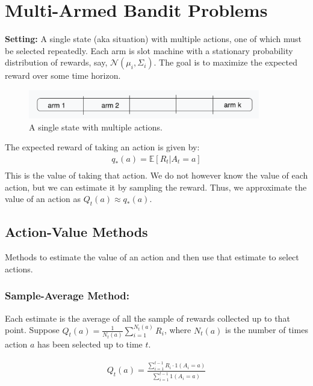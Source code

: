 \section{Multi-Armed Bandit Problems}
\textbf{Setting:} A single state (aka situation) with multiple actions, one of which must be selected repeatedly. Each arm is slot machine with a stationary
probability distribution of rewards, say, $\mathcal{N}(\mu_i, \Sigma_i)$. The goal is to maximize the expected reward over some time horizon.

\begin{figure}[h]
    \centering
    \includegraphics[width=0.9\textwidth]{img/bandit.png}
    \caption{A single state with multiple actions.}
    \label{fig:bandit}
\end{figure}


The expected reward of taking an action is given by:
\begin{equation}
    \begin{split}
        q_*(a) = \mathbb{E}[R_t | A_t = a] \\
        \label{eq:bandit}
    \end{split}
\end{equation}
This is the value of taking that action. We do not however know the value of each action, but we can estimate it by sampling the reward.
Thus, we approximate the value of an action as $Q_t(a) \approx q_*(a)$.

\subsection{Action-Value Methods}
Methods to estimate the value of an action and then use that estimate to select actions.

\subsubsection{Sample-Average Method:}
Each estimate is the average of all the sample of rewards collected up to that point.
\newline
Suppose $Q_t(a) = \frac{1}{N_t(a)} \sum_{i=1}^{N_t(a)} R_i$, where $N_t(a)$ is the number of times action $a$ has been selected up to time $t$.

\begin{equation}
    \begin{split}
        Q_t(a) = \frac{\sum_{i=1}^{t-1} R_i \cdot 1(A_i = a)}{\sum_{i=1}^{t-1} 1(A_i = a)} \\
        \label{eq:action-value}
    \end{split}
\end{equation}


